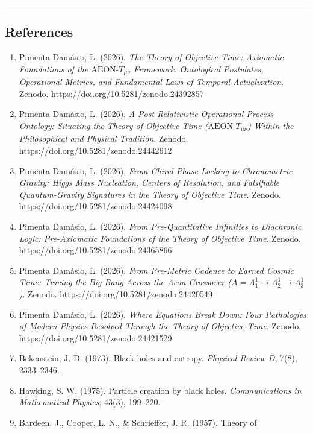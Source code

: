 \documentclass[
]{article}
\providecommand{\tightlist}{%
  \setlength{\itemsep}{0pt}\setlength{\parskip}{0pt}}
\begin{document}
\begin{center}\rule{0.5\linewidth}{0.5pt}\end{center}

\subsection{References}\label{references}

\begin{enumerate}
\def\labelenumi{\arabic{enumi}.}
\tightlist
\item
  Pimenta Damásio, L. (2026). \emph{The Theory of Objective Time:
  Axiomatic Foundations of the \(\text{AEON-}T_{\mu\nu}\) Framework:
  Ontological Postulates, Operational Metrics, and Fundamental Laws of
  Temporal Actualization}. Zenodo.
  https://doi.org/10.5281/zenodo.24392857
\item
  Pimenta Damásio, L. (2026). \emph{A Post-Relativistic Operational
  Process Ontology: Situating the Theory of Objective Time
  (\(\text{AEON-}T_{\mu\nu}\)) Within the Philosophical and Physical
  Tradition}. Zenodo. https://doi.org/10.5281/zenodo.24442612
\item
  Pimenta Damásio, L. (2026). \emph{From Chiral Phase-Locking to
  Chronometric Gravity: Higgs Mass Nucleation, Centers of Resolution,
  and Falsifiable Quantum-Gravity Signatures in the Theory of Objective
  Time}. Zenodo. https://doi.org/10.5281/zenodo.24424098
\item
  Pimenta Damásio, L. (2026). \emph{From Pre-Quantitative Infinities to
  Diachronic Logic: Pre-Axiomatic Foundations of the Theory of Objective
  Time}. Zenodo. https://doi.org/10.5281/zenodo.24365866
\item
  Pimenta Damásio, L. (2026). \emph{From Pre-Metric Cadence to Earned
  Cosmic Time: Tracing the Big Bang Across the Aeon Crossover
  (\(A = A_1^1 \to A_2^1 \to A_3^1\))}. Zenodo.
  https://doi.org/10.5281/zenodo.24420549
\item
  Pimenta Damásio, L. (2026). \emph{Where Equations Break Down: Four
  Pathologies of Modern Physics Resolved Through the Theory of Objective
  Time}. Zenodo. https://doi.org/10.5281/zenodo.24421529
\item
  Bekenstein, J. D. (1973). Black holes and entropy. \emph{Physical
  Review D}, 7(8), 2333--2346.
\item
  Hawking, S. W. (1975). Particle creation by black holes.
  \emph{Communications in Mathematical Physics}, 43(3), 199--220.
\item
  Bardeen, J., Cooper, L. N., \& Schrieffer, J. R. (1957). Theory of

\end{enumerate}
\end{document}
